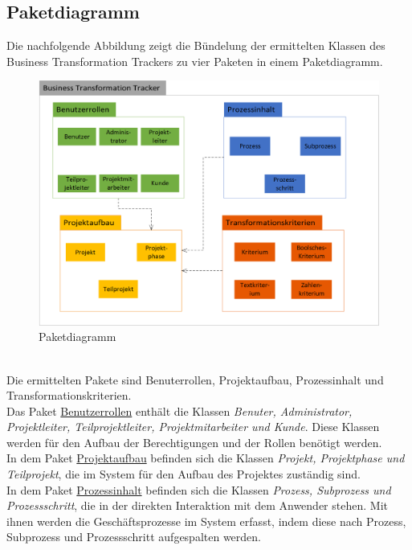 \subsection{Paketdiagramm}
Die nachfolgende Abbildung zeigt die Bündelung der ermittelten Klassen des Business Transformation Trackers zu vier Paketen in einem Paketdiagramm.\\
\begin{figure}[h!]
    \centering
    \includegraphics[scale=0.8]{./Bilder/Paketdiagramm.png}
    \caption[Paketdiagramm]{Paketdiagramm}
    \label{fig:Paketdiagramm}
\end{figure}
\\Die ermittelten Pakete sind \glqq{}Benuterrollen\grqq{}, \glqq{}Projektaufbau\grqq{}, \glqq{}Prozessinhalt\grqq{} und \glqq{}Transformationskriterien\grqq{}. 
\vspace{1em}
\\Das Paket \underline{Benutzerrollen} enthält die Klassen \emph{Benuter, Administrator, Projektleiter, Teilprojektleiter, Projektmitarbeiter und Kunde}. Diese Klassen werden für den Aufbau der Berechtigungen und der Rollen benötigt werden. 
\vspace{1em}
\\In dem Paket \underline{Projektaufbau} befinden sich die Klassen \emph{Projekt, Projektphase und Teilprojekt}, die im System für den Aufbau des Projektes zuständig sind. 
\vspace{1em}
\\In dem Paket \underline{Prozessinhalt} befinden sich die Klassen \emph{Prozess, Subprozess und Prozessschritt}, die in der direkten Interaktion mit dem Anwender stehen. Mit ihnen werden die Geschäftsprozesse im System erfasst, indem diese nach Prozess, Subprozess und Prozessschritt aufgespalten werden. 
